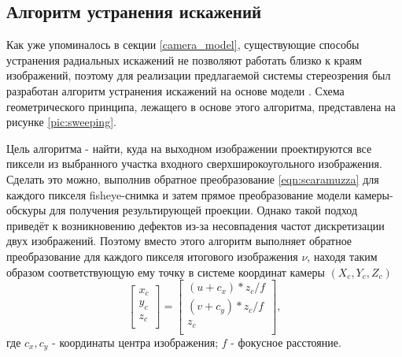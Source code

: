 \subsection{Алгоритм устранения искажений}

Как уже упоминалось в секции \ref{camera_model}, существующие способы устранения радиальных искажений не
позволяют работать близко к краям изображений, поэтому для реализации предлагаемой системы стереозрения     %
был разработан алгоритм устранения искажений на основе модели \cite{scaramuzza}. Схема геометрического
принципа, лежащего в основе этого алгоритма, представлена на рисунке \ref{pic:sweeping}.

Цель алгоритма - найти, куда на выходном изображении проектируются все пиксели из выбранного участка входного 
сверхширокоугольного изображения. Сделать это можно, выполнив обратное преобразование \ref{eqn:scaramuzza} для каждого пикселя 
fisheye-снимка и затем прямое преобразование модели камеры-обскуры для получения результирующей проекции. Однако такой подход 
приведёт к возникновению дефектов из-за несовпадения частот дискретизации двух изображений.                 %
Поэтому вместо этого алгоритм выполняет обратное преобразование  для каждого пикселя итогового изображения $\nu$, 
находя таким образом соответствующую ему точку в системе координат камеры $({X_c, Y_c, Z_c})$ 
\begin{equation}
    \label{eq:uv_to_xyz}
    \left[\begin{matrix}x_c\\y_c\\z_c\\\end{matrix}\right] = \left[\begin{matrix} {(u+c_x)*z_c}/f \\  {(v+c_y)*z_c}/f \\ z_c \\\end{matrix}\right],
\end{equation} 
где $c_x, c_y$ - координаты центра изображения; $f$ - фокусное расстояние. 

